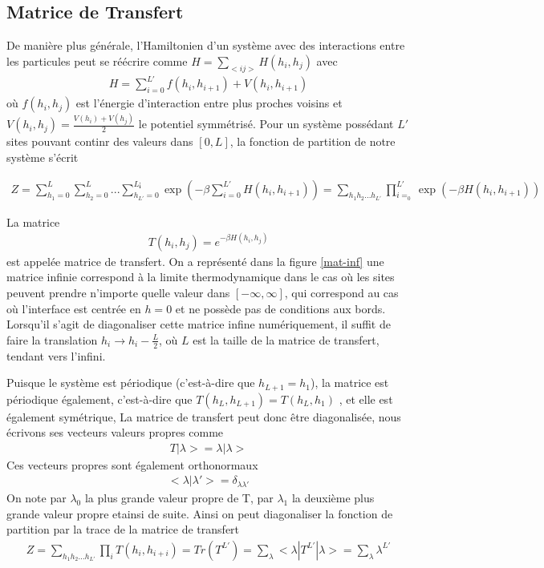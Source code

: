   \subsection{Matrice de Transfert}

	De manière plus générale, l'Hamiltonien d'un système avec des interactions entre les particules peut se réécrire comme $H = \sum_{< ij >} H(h_i,h_j)$ avec
\begin{align*}
  H = \sum_{i=0}^{L'} f(h_i,h_{i+1}) + V(h_i,h_{i+1}) 
\end{align*}
où $f(h_i,h_j)$ est l'énergie d'interaction entre plus proches voisins et $V(h_i,h_j)=\frac{V(h_i)+V(h_j)}{2}$ le potentiel symmétrisé. Pour un système possédant $L'$ sites pouvant continr des valeurs dans $[0,L]$, la fonction de partition de notre système s'écrit 

\begin{align}
 Z = \sum_{h_1=0}^{L} \sum_{h_2=0}^{L}... \sum_{h_{L'}=0}^{L¡} \exp(- \beta \sum_{i=0}^{L'} H(h_i,h_{i+1}))
   = \sum_{h_1 h_2 ... h_{L'}} \prod_{i=_0}^{L'} \exp(-\beta H(h_i,h_{i+1}))
\end{align}

La matrice 
\begin{align}
    T(h_i,h_j) = e^{-\beta H(h_i,h_j)}
    \label{matric-transfert}
\end{align}
est appelée matrice de transfert. On a représenté dans la figure \ref{mat-inf} une matrice infinie correspond à la limite thermodynamique dans le cas où les sites peuvent prendre n'importe quelle valeur dans $[-\infty,\infty]$, qui correspond au cas où l'interface est centrée en $h=0$ et ne possède pas de conditions aux bords. Lorsqu'il s'agit de diagonaliser cette matrice infine numériquement, il suffit de faire la translation $h_i \to h_i - \frac{L}{2}$, où $L$ est la taille de la matrice de transfert, tendant vers l'infini.

Puisque le système est périodique (c'est-à-dire que $h_{L+1} = h_1$),  la matrice est périodique également, c'est-à-dire que $T(h_L,h_{L+1}) = T(h_L,h_1)$ \cite{pearce_exact_1989}, et elle est également symétrique, La matrice de transfert peut donc être diagonalisée, nous écrivons ses vecteurs valeurs propres comme
\begin{align}
    T | \lambda> = \lambda |\lambda>
\end{align}
Ces vecteurs propres sont également orthonormaux 
\begin{align}
    < \lambda | \lambda'> = \delta_{\lambda \lambda'}
\end{align}
On note par $\lambda_0$ la plus grande valeur propre de T, par $\lambda_1$ la deuxième plus grande valeur propre etainsi de suite. 
Ainsi on peut diagonaliser la fonction de partition par la trace de la matrice de transfert \cite{abraham_transfer_1973}
\begin{align}
  Z = \sum_{h_1 h_2 ... h_{L'}} \prod_{i} T(h_i,h_{i+i}) = Tr( T^{L'})  = \sum_\lambda <\lambda | T^{L'} | \lambda> = \sum_\lambda \lambda^{L'}
  \label{partition-trace-lambda}
\end{align}

